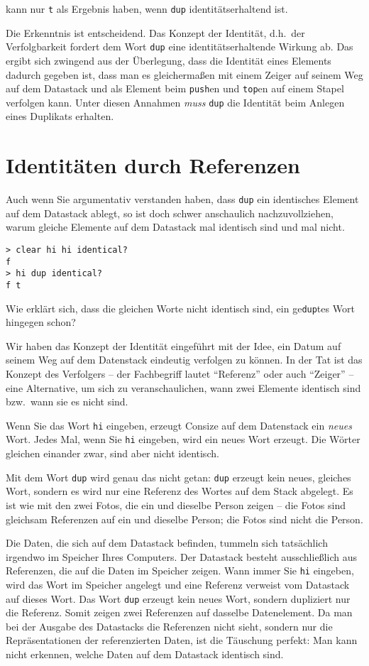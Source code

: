 kann nur \verb|t| als Ergebnis haben, wenn \verb|dup| identitätserhaltend ist.

Die Erkenntnis ist entscheidend. Das Konzept der Identität, d.h.\ der Verfolgbarkeit fordert dem Wort \verb|dup| eine identitätserhaltende Wirkung ab. Das ergibt sich zwingend aus der Überlegung, dass die Identität eines Elements dadurch gegeben ist, dass man es gleichermaßen mit einem Zeiger auf seinem Weg auf dem Datastack und als Element beim \verb|push|en und \verb|top|en auf einem Stapel verfolgen kann. Unter diesen Annahmen \emph{muss} \verb|dup| die Identität beim Anlegen eines Duplikats erhalten.

\section{Identitäten durch Referenzen}

Auch wenn Sie argumentativ verstanden haben, dass \verb|dup| ein identisches Element auf dem Datastack ablegt, so ist doch schwer anschaulich nachzuvollziehen, warum gleiche Elemente auf dem Datastack mal identisch sind und mal nicht.

\begin{verbatim}
> clear hi hi identical?
f
> hi dup identical?
f t
\end{verbatim}

Wie erklärt sich, dass die gleichen Worte nicht identisch sind, ein ge\verb|dup|tes Wort hingegen schon?

Wir haben das Konzept der Identität eingeführt mit der Idee, ein Datum auf seinem Weg auf dem Datenstack eindeutig verfolgen zu können. In der Tat ist das Konzept des Verfolgers -- der Fachbegriff lautet "`Referenz"' oder auch "`Zeiger"' -- eine Alternative, um sich zu veranschaulichen, wann zwei Elemente identisch sind bzw.\ wann sie es nicht sind.

Wenn Sie das Wort \verb|hi| eingeben, erzeugt Consize auf dem Datenstack ein \emph{neues} Wort. Jedes Mal, wenn Sie \verb|hi| eingeben, wird ein neues Wort erzeugt. Die Wörter gleichen einander zwar, sind aber nicht identisch.

Mit dem Wort \verb|dup| wird genau das nicht getan: \verb|dup| erzeugt kein neues, gleiches Wort, sondern es wird nur eine Referenz des Wortes auf dem Stack abgelegt. Es ist wie mit den zwei Fotos, die ein und dieselbe Person zeigen -- die Fotos sind gleichsam Referenzen auf ein und dieselbe Person; die Fotos sind nicht die Person.

Die Daten, die sich auf dem Datastack befinden, tummeln sich tat\-säch\-lich irgendwo im Speicher Ihres Computers. Der Datastack besteht ausschließlich aus Referenzen, die auf die Daten im Speicher zeigen. Wann immer Sie \verb|hi| eingeben, wird das Wort im Speicher angelegt und eine Referenz verweist vom Datastack auf dieses Wort. Das Wort \verb|dup| erzeugt kein neues Wort, sondern dupliziert nur die Referenz. Somit zeigen zwei Referenzen auf dasselbe Datenelement. Da man bei der Ausgabe des Datastacks die Referenzen nicht sieht, sondern nur die Repräsentationen der referenzierten Daten, ist die Täuschung perfekt: Man kann nicht erkennen, welche Daten auf dem Datastack identisch sind.

